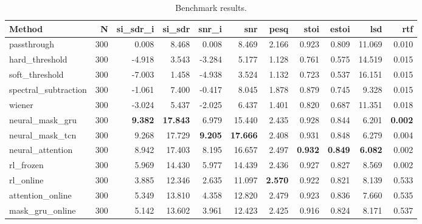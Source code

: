 \begin{table}[t]
\centering
\caption{Benchmark results.}
\label{tab:bench}
\begin{tabular}{lrrrrrrrrrr}
\toprule
Method & N & si\_sdr\_i & si\_sdr & snr\_i & snr & pesq & stoi & estoi & lsd & rtf \\
\midrule
passthrough & 300 & 0.008 & 8.468 & 0.008 & 8.469 & 2.166 & 0.923 & 0.809 & 11.069 & 0.010 \\
hard_threshold & 300 & -4.918 & 3.543 & -3.284 & 5.177 & 1.128 & 0.761 & 0.575 & 14.519 & 0.015 \\
soft_threshold & 300 & -7.003 & 1.458 & -4.938 & 3.524 & 1.132 & 0.723 & 0.537 & 16.151 & 0.015 \\
spectral_subtraction & 300 & -1.061 & 7.400 & -0.417 & 8.045 & 1.878 & 0.879 & 0.745 & 9.328 & 0.015 \\
wiener & 300 & -3.024 & 5.437 & -2.025 & 6.437 & 1.401 & 0.820 & 0.687 & 11.351 & 0.018 \\
neural_mask_gru & 300 & \textbf{9.382} & \textbf{17.843} & 6.979 & 15.440 & 2.435 & 0.928 & 0.844 & 6.201 & \textbf{0.002} \\
neural_mask_tcn & 300 & 9.268 & 17.729 & \textbf{9.205} & \textbf{17.666} & 2.408 & 0.931 & 0.848 & 6.279 & 0.004 \\
neural_attention & 300 & 8.942 & 17.403 & 8.195 & 16.657 & 2.497 & \textbf{0.932} & \textbf{0.849} & \textbf{6.082} & 0.002 \\
rl_frozen & 300 & 5.969 & 14.430 & 5.977 & 14.439 & 2.436 & 0.927 & 0.827 & 8.569 & 0.002 \\
rl_online & 300 & 3.885 & 12.346 & 2.635 & 11.097 & \textbf{2.570} & 0.922 & 0.821 & 8.139 & 0.533 \\
attention_online & 300 & 5.349 & 13.810 & 4.358 & 12.820 & 2.479 & 0.923 & 0.836 & 7.660 & 0.535 \\
mask_gru_online & 300 & 5.142 & 13.602 & 3.961 & 12.423 & 2.425 & 0.916 & 0.824 & 8.171 & 0.537 \\
\bottomrule
\end{tabular}
\end{table}